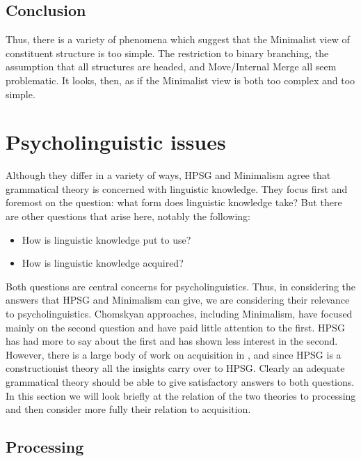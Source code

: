 \documentclass[output=paper
	        ,collection
	        ,collectionchapter
 	        ,biblatex
                ,babelshorthands
                ,newtxmath
                ,draftmode
                ,colorlinks, citecolor=brown
]{langscibook}
\begin{document}
\subsection{Conclusion}

Thus, there is a variety of phenomena which suggest that the Minimalist view of constituent structure
is too simple. The restriction to binary branching, the assumption that all structures are headed,
and Move/Internal Merge all seem problematic. It looks, then, as if the Minimalist view is both too
complex and too simple. 





\section{Psycholinguistic issues}
\label{sec-psycho}

Although they differ in a variety of ways, HPSG and Minimalism agree that grammatical theory is
concerned with linguistic knowledge. They focus first and foremost on the question: what form does
linguistic knowledge take? But there are other questions that arise here, notably the following: 

\begin{itemize}
\item How is linguistic knowledge put to use? 
\item How is linguistic knowledge acquired?
\end{itemize}

\noindent
Both questions are central concerns for psycholinguistics. Thus, in considering the answers that
HPSG and Minimalism can give, we are considering their relevance to psycholinguistics. Chomskyan
approaches, including Minimalism, have focused mainly on the second question and have paid little
attention to the first. HPSG has had more to say about the first and has shown less interest in the
second. However, there is a large body of work on acquisition in , and
since HPSG is a constructionist theory  all the insights carry over to HPSG. 
Clearly an adequate grammatical theory should be able to give satisfactory answers to both
questions. In this section we will look briefly at the relation of the two theories to processing
and then consider more fully their relation to acquisition.


\subsection{Processing}
\label{sec-minimalism-processing}
\end{document}
